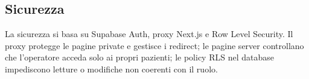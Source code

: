 \subsection{Sicurezza}

La sicurezza si basa su Supabase Auth, proxy Next.js e Row Level Security. Il proxy protegge le pagine private e gestisce i redirect; le pagine server controllano che l'operatore acceda solo ai propri pazienti; le policy RLS nel database impediscono letture o modifiche non coerenti con il ruolo.

\newpage
